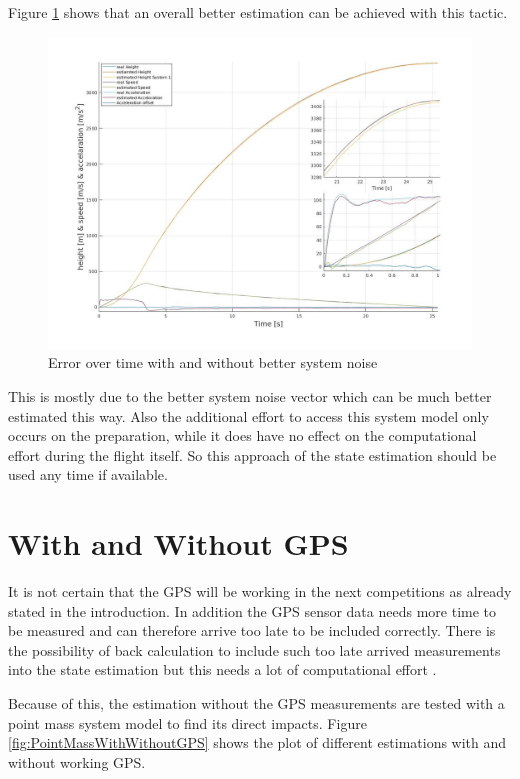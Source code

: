 Figure \ref{fig:PointMassVSBetterNoise} shows that an overall better estimation can be achieved with this tactic.
\begin{figure}[h!]
 \centering
 \includegraphics[width=.8\textwidth]{./Pictures/PointMassVSBetterNoise.jpg}
 \caption{Error over time with and without better system noise}
 \label{fig:PointMassVSBetterNoise}
\end{figure}
This is mostly due to the better system noise vector which can be much better estimated this way.
Also the additional effort to access this system model only occurs on the preparation,
while it does have no effect on the computational effort during the flight itself.
So this approach of the state estimation should be used any time if available.

\section{With and Without GPS}
It is not certain that the GPS will be working in the next competitions as already stated in the introduction.
In addition the GPS sensor data needs more time to be measured and can therefore arrive too late to be included correctly.
There is the possibility of back calculation to include such too late arrived measurements into the state estimation but this needs a lot of computational effort \cite{SimonDan2006Ose:}.

Because of this, the estimation without the GPS measurements are tested with a point mass system model to find its direct impacts.
Figure \ref{fig:PointMassWithWithoutGPS} shows the plot of different estimations with and without working GPS.

